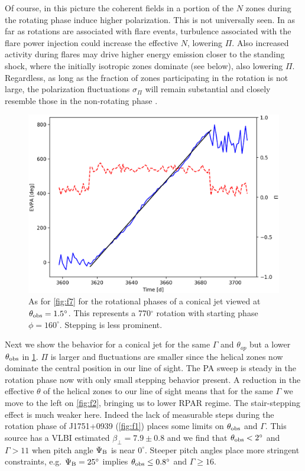 Of course, in this picture the coherent fields in a portion of the $N$ zones during the rotating phase induce higher polarization. This is not universally seen. In as far as rotations are associated with flare events, turbulence associated with the flare power injection could increase the effective $N$, lowering $\Pi$. Also increased activity during flares may drive higher energy emission closer to the standing shock, where the initially isotropic zones dominate (see below), also lowering $\Pi$. Regardless, as long as the fraction of zones participating in the rotation is not large, the polarization fluctuations $\sigma_\Pi$ will remain substantial and closely resemble those in the non-rotating phase \citep{blinov_robopol:_2016}.

\begin{figure}[t]
\label{fig:f8}
\includegraphics[width=0.8\linewidth]{figures/f8.eps}
\centering
\caption{As for \cref{fig:f7} for the rotational phases of a conical jet viewed at $\theta_{\rm obs} = 1.5^{\circ}$. This represents a 770$^{\circ}$ rotation with starting phase $\phi=160^{\circ}$. Stepping is less prominent.}
\end{figure}

Next we show the behavior for a conical jet for the same $\Gamma$ and $\theta_{op}$ but a lower $\theta_{\rm obs}$ in \cref{fig:f8}. $\Pi$ is larger and fluctuations are smaller since the helical zones now dominate the central position in our line of sight. The PA sweep is steady in the rotation phase now with only small stepping behavior present. A reduction in the effective $\theta$ of the helical zones to our line of sight means that for the same $\Gamma$ we move to the left on \cref{fig:f2}, bringing us to lower RPAR regime. The stair-stepping effect is much weaker here. Indeed the lack of measurable steps during the rotation phase of J1751+0939 (\cref{fig:f1}) places some limits on $\theta_{\rm obs}$ and $\Gamma$. This source has a VLBI estimated $\beta_\perp = 7.9\pm 0.8$ \citep{lister_mojave._2013} and we find that $\theta_{\rm obs} < 2^{\circ}$ and $\Gamma > 11$ when pitch angle $\Psi_{\rm B}$ is near $0^{\circ}$. Steeper pitch angles place more stringent constraints, e.g. $\Psi_{\rm B} = 25^{\circ}$ implies $\theta_{\rm obs} \leq 0.8^{\circ}$ and $\Gamma \geq 16$.
    
